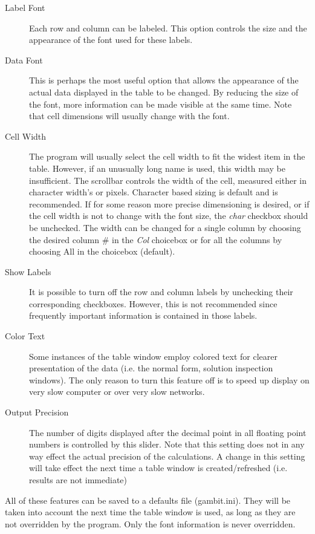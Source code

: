 {\begin{description}
\item[Label Font] Each row and column can be labeled.  This option controls
the size and the appearance of the font used for these labels.
\item[Data Font] This is perhaps the most useful option that allows the 
appearance of the actual data displayed in the table to be changed.  By
reducing the size of the font, more information can be made visible at the
same time.  Note that cell dimensions will usually change with the font.
\item[Cell Width] The program will usually select the cell width to fit the
widest item in the table.  However, if an unusually long name is used,
this width may be insufficient.  The scrollbar controls the width of the
cell, measured either in character width's or pixels.  Character based
sizing is default and is recommended.  If for some reason more precise
dimensioning is desired, or if the cell width is not to change with the
font size, the {\em char} checkbox should be unchecked.  The width can be
changed for a single column by choosing the desired column \# in the {\em
Col} choicebox or for all the columns by choosing All in the choicebox
(default).
\item[Show Labels] It is possible to turn off the row and column labels by 
unchecking their corresponding checkboxes.  However, this is not
recommended since frequently important information is contained in those
labels.
\item[Color Text] Some instances of the table window employ colored text 
for clearer presentation of the data (i.e. the normal form, solution
inspection windows).  The only reason to turn this feature off is to speed
up display on very slow computer or over very slow networks.
\item[Output Precision] The number of digits displayed after the decimal point
in all floating point numbers is controlled by this slider.  Note that this
setting does not in any way effect the actual precision of the calculations.
A change in this setting will take effect the next time a table window is
created/refreshed (i.e. results are not immediate)
\end{description}

All of these features can be saved to a defaults file (gambit.ini).  They
will be taken into account the next time the table window is used, as long
as they are not overridden by the program.  Only the font information is
never overridden.


}
